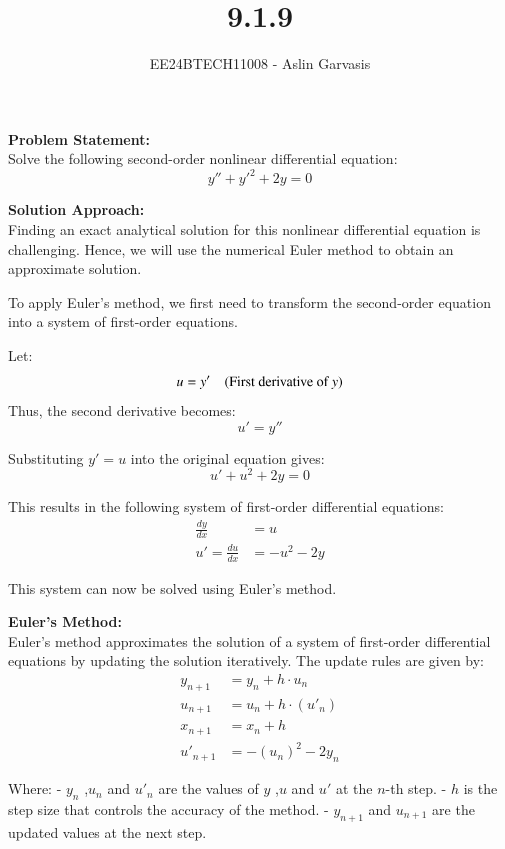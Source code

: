 \documentclass[journal]{IEEEtran}
\begin{document}
\title{9.1.9}
\author{EE24BTECH11008 - Aslin Garvasis}
\maketitle

\textbf{Problem Statement:}\\
Solve the following second-order nonlinear differential equation:
\begin{equation}
y'' + y'^2 + 2y = 0
\end{equation}

\textbf{Solution Approach:}\\
Finding an exact analytical solution for this nonlinear differential equation is challenging. Hence, we will use the numerical Euler method to obtain an approximate solution.

To apply Euler’s method, we first need to transform the second-order equation into a system of first-order equations.

Let:
\[
u = y' \quad \text{(First derivative of \( y \))}
\]
Thus, the second derivative becomes:
\[
u' = y''
\]

Substituting \( y' = u \) into the original equation gives:
\begin{equation}
u' + u^2 + 2y = 0
\end{equation}

This results in the following system of first-order differential equations:
\begin{align}
\frac{dy}{dx} &= u \\
u' =\frac{du}{dx} &= -u^2 - 2y
\end{align}

This system can now be solved using Euler's method.

\textbf{Euler’s Method:}\\
Euler's method approximates the solution of a system of first-order differential equations by updating the solution iteratively. The update rules are given by:
\begin{align}
y_{n+1} &= y_n + h \cdot u_n \\
u_{n+1} &= u_n + h \cdot (u'_n) \\
x_{n+1} &= x_n + h \\
u'_{n+1} &= -(u_n)^2 - 2y_n
\end{align}

Where:
- \( y_n \) ,\( u_n \) and \( u'_n \) are the values of \( y \) ,\( u \) and \( u' \) at the \( n \)-th step.
- \( h \) is the step size that controls the accuracy of the method.
- \( y_{n+1} \) and \( u_{n+1} \) are the updated values at the next step.
\end{document}
